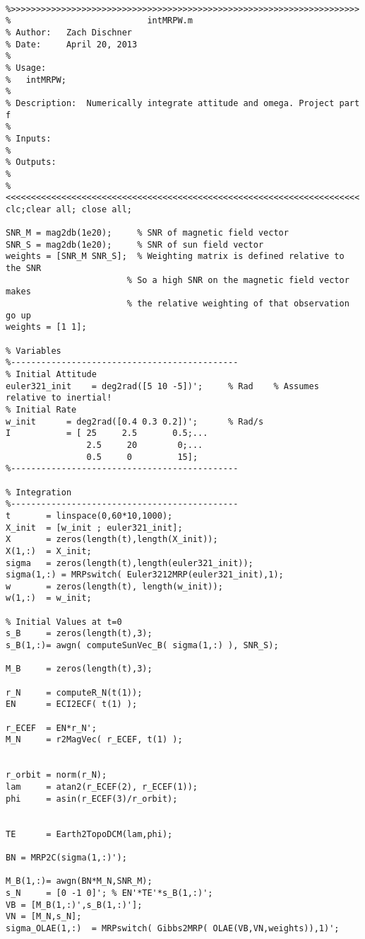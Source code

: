 \documentclass[11pt]{aiaa-tc}%
\begin{document}
\label{APP:SIM}
\begin{lstlisting}

%>>>>>>>>>>>>>>>>>>>>>>>>>>>>>>>>>>>>>>>>>>>>>>>>>>>>>>>>>>>>>>>>>>>>> 
%                           intMRPW.m
% Author:   Zach Dischner
% Date:     April 20, 2013
% 
% Usage:
%   intMRPW;
%
% Description:  Numerically integrate attitude and omega. Project part f
% 
% Inputs:  
%
% Outputs: 
% 
%<<<<<<<<<<<<<<<<<<<<<<<<<<<<<<<<<<<<<<<<<<<<<<<<<<<<<<<<<<<<<<<<<<<<<<
clc;clear all; close all;

SNR_M = mag2db(1e20);     % SNR of magnetic field vector
SNR_S = mag2db(1e20);     % SNR of sun field vector
weights = [SNR_M SNR_S];  % Weighting matrix is defined relative to the SNR
                        % So a high SNR on the magnetic field vector makes
                        % the relative weighting of that observation go up
weights = [1 1];

% Variables 
%---------------------------------------------
% Initial Attitude
euler321_init    = deg2rad([5 10 -5])';     % Rad    % Assumes relative to inertial!
% Initial Rate
w_init      = deg2rad([0.4 0.3 0.2])';      % Rad/s
I           = [ 25     2.5       0.5;...
                2.5     20        0;...
                0.5     0         15];
%---------------------------------------------

% Integration
%---------------------------------------------
t       = linspace(0,60*10,1000);
X_init  = [w_init ; euler321_init];
X       = zeros(length(t),length(X_init));
X(1,:)  = X_init;
sigma   = zeros(length(t),length(euler321_init));
sigma(1,:) = MRPswitch( Euler3212MRP(euler321_init),1);
w       = zeros(length(t), length(w_init));
w(1,:)  = w_init;

% Initial Values at t=0
s_B     = zeros(length(t),3); 
s_B(1,:)= awgn( computeSunVec_B( sigma(1,:) ), SNR_S);

M_B     = zeros(length(t),3);

r_N     = computeR_N(t(1));
EN      = ECI2ECF( t(1) );

r_ECEF  = EN*r_N';
M_N     = r2MagVec( r_ECEF, t(1) );


r_orbit = norm(r_N);
lam     = atan2(r_ECEF(2), r_ECEF(1)); 
phi     = asin(r_ECEF(3)/r_orbit);
                 

TE      = Earth2TopoDCM(lam,phi);

BN = MRP2C(sigma(1,:)');

M_B(1,:)= awgn(BN*M_N,SNR_M);
s_N     = [0 -1 0]'; % EN'*TE'*s_B(1,:)';
VB = [M_B(1,:)',s_B(1,:)'];
VN = [M_N,s_N];
sigma_OLAE(1,:)  = MRPswitch( Gibbs2MRP( OLAE(VB,VN,weights)),1)';




\end{lstlisting}
\end{document}
